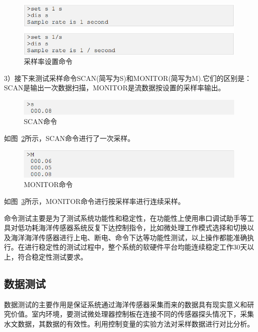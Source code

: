 \begin{figure}[ht]
    \centering
	\includegraphics[width=1\textwidth]{fig/采样率设置命令.png}
	\caption{采样率设置命令}
	\label{fig:采样率设置命令}
\end{figure}

3）接下来测试采样命令SCAN(简写为S)和MONITOR(简写为M).它们的区别是：SCAN是输出一次数据扫描，MONITOR是流数据按设置的采样率输出。

\begin{figure}[ht]
    \centering
	\includegraphics[width=1\textwidth]{fig/SCAN命令.png}
	\caption{SCAN命令}
	\label{fig:SCAN命令}
\end{figure}

如图~\ref{fig:SCAN命令}所示，SCAN命令进行了一次采样。

\begin{figure}[ht]
    \centering
	\includegraphics[width=1\textwidth]{fig/MONITOR命令.png}
	\caption{MONITOR命令}
	\label{fig:MONITOR命令}
\end{figure}

如图~\ref{fig:MONITOR命令}所示，MONITOR命令进行按采样率进行连续采样。

命令测试主要是为了测试系统功能性和稳定性，在功能性上使用串口调试助手等工具对低功耗海洋传感器系统反复下达控制指令，比如微处理工作模式选择和切换以及海洋海洋传感器进行上电、断电、命令下达等功能性测试，以上操作都能准确执行。在进行稳定性的测试过程中，整个系统的软硬件平台均能连续稳定工作30天以上，符合稳定性测试要求。

\subsection{数据测试}
数据测试的主要作用是保证系统通过海洋传感器采集而来的数据具有现实意义和研究价值。室内环境，要测试微处理器控制板在连接不同的传感器探头情况下，采集水文数据，其数据的有效性。利用控制变量的实验方法对采样数据进行对比分析。

